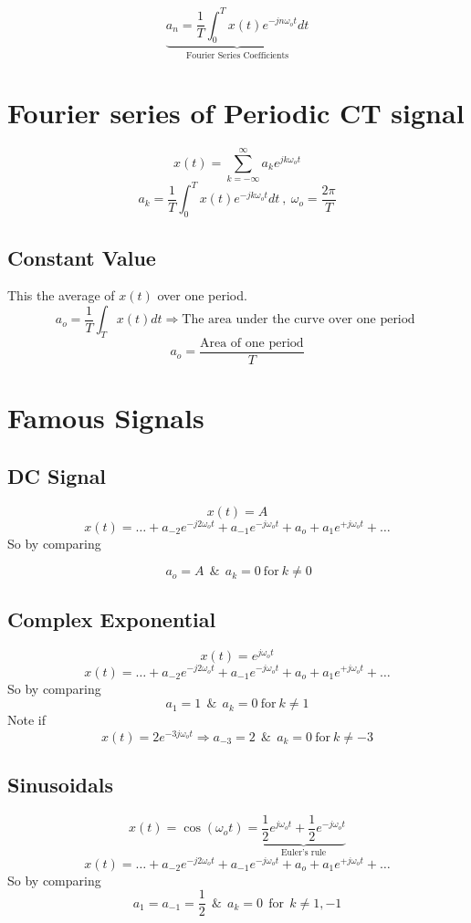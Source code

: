 \documentclass[11pt,a4paper]{article}
\theoremstyle{definition}
\begin{document}
\[
    \underbrace{a_n = \dfrac{1}{T} \int_0^T x(t)e^{-jn\omega_ot} dt }_{\text{Fourier Series Coefficients}}
\]

\section{Fourier series of Periodic CT signal}

\[
    \displaystyle x(t) = \sum_{k=-\infty}^{\infty} a_k e^{jk\omega_ot}
\]
\[
    a_k = \dfrac{1}{T} \int_0^T x(t)e^{-jk\omega_ot} dt \ , \ \omega_o
    = \dfrac{2\pi}{T}
\]
\subsection{Constant Value}
This the average of $x(t)$ over one period.
\[
    a_o = \dfrac{1}{T} \int_T x(t) dt \Rightarrow \text{The area under the curve over one period }
\]
\[
    a_o = \dfrac{\text{Area of one period}}{T}
\]
\section{Famous Signals}
\subsection{DC Signal}
\[
    x(t) = A
\]
\[
    x(t) = \dots + a_{-2}e^{-j2\omega_ot}
    + a_{-1}e^{-j\omega_ot} + a_o + a_{1}e^{+j\omega_ot} + \dots
\]
So by comparing 

\[
    \boxed{\ a_o = A \ \ \& \ \  a_k = 0 \ \text{for} \ k \neq 0}
\]
\subsection{Complex Exponential}
\[
    x(t) = e^{j\omega_ot}
\]
\[
    x(t) = \dots + a_{-2}e^{-j2\omega_ot}
    + a_{-1}e^{-j\omega_ot} + a_o + a_{1}e^{+j\omega_ot} + \dots
\]
So by comparing 
\[
    \boxed{a_1 = 1 \ \ \& \ \ a_k = 0  \ \text{for} \  k \neq 1}
\]
Note if 
\[
    x(t) = 2e^{-3j\omega_ot} \Rightarrow a_{-3} = 2 \ \ \& \ \ a_k = 0  \ \text{for} \ k \neq -3
\]
\subsection{Sinusoidals}

\[
    x(t) = \cos(\omega_ot) = \underbrace{\dfrac{1}{2} e^{j\omega_ot} + \dfrac{1}{2} e^{-j\omega_ot}}_{\text{Euler's rule}}
\]
\[
    x(t) = \dots + a_{-2}e^{-j2\omega_ot}
    + a_{-1}e^{-j\omega_ot} + a_o + a_{1}e^{+j\omega_ot} + \dots
\]
So by comparing 
\[
    \boxed{a_1 = a_{-1} = \frac{1}{2} \ \ \& \ \ a_k = 0  \ \
    \text{for} \ \ k \neq 1, -1 }
\]
\end{document}
